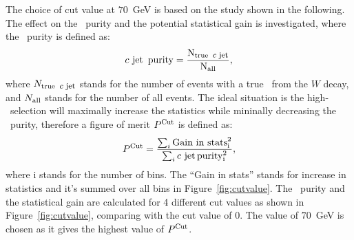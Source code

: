 \documentclass[letterpaper,12pt]{article}
\newcommand\cjetineq{\mathop{\mbox{$c$ $\rm{jet}$}}}
\newcommand\cjetunder{\mathop{\footnotesize{\mbox{$c$ $\rm{jet}$}}}\normalsize}
\begin{document}
The choice of cut value at $70$~GeV is based on the
study shown in the following. 
The effect on the \cjet\ purity and the potential statistical gain is investigated, 
where the \cjet\ purity is defined as:
\begin{equation}
\cjetineq\ \rm{purity} = \frac{N_{\rm{true}\ \cjetunder}}{N_{\rm{all}}},
\end{equation}
where $N_{\rm{true}\ \cjetunder}$ stands for the number of events with a 
true \cjet\ from the $W$ decay, and $N_{\rm{all}}$ stands for the number of all events. 
The ideal situation is the high-\pt\ selection will maximally increase the 
statistics while mininally decreasing the \cjet\ purity, therefore a figure of merit $P^{\rm{Cut}}$
is defined as:
\[P^{\rm{Cut}} = \frac{\sum_i{\rm{Gain\ in\ stats}^2_i}}{\sum_i{\cjetineq \rm{purity}^2_i }}, \]
where i stands for the number of bins. The ``Gain in stats'' stands for increase in 
statistics and it's summed over all bins in Figure~\ref{fig:cutvalue}.
The \cjet\ purity and the statistical gain are calculated for 4 different cut 
values as shown in Figure~\ref{fig:cutvalue}, comparing with the cut value of 0. 
The value of $70$~GeV is chosen as it gives the highest value of $P^{\rm{Cut}}$. 
\end{document}
